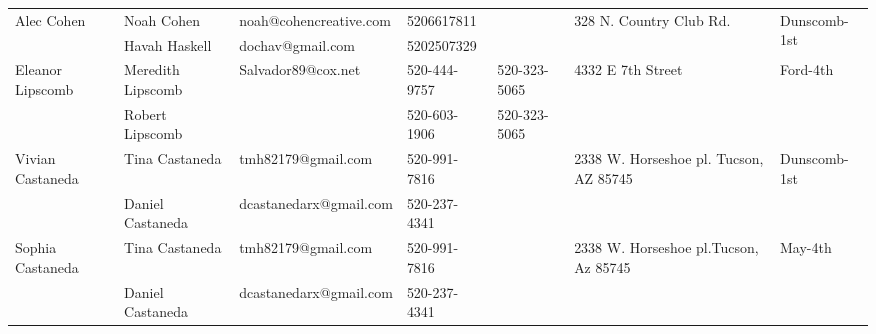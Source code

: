 \documentclass[landscape]{book}\usepackage[]{graphicx}\usepackage[]{color}
\begin{document}
\begin{longtable}{p{70pt}|p{75pt}|p{120pt}|p{60pt}|p{60pt}|p{100pt}|p{70pt}|}
\hline
\multirow{2}{70pt}{Alec Cohen} & Noah Cohen & noah@cohencreative.com & 5206617811 &  & \multirow{2}{100pt}{328 N. Country Club Rd.} & \multirow{2}{70pt}{Dunscomb-1st}\\
 & Havah Haskell & dochav@gmail.com & 5202507329 &  & & \\
\hline
\multirow{2}{70pt}{Eleanor Lipscomb} & Meredith Lipscomb & Salvador89@cox.net & 520-444-9757 & 520-323-5065 & \multirow{2}{100pt}{4332 E 7th Street} & \multirow{2}{70pt}{Ford-4th}\\
 & Robert Lipscomb &  & 520-603-1906 & 520-323-5065 & & \\
\hline
\multirow{2}{70pt}{Vivian Castaneda} & Tina Castaneda & tmh82179@gmail.com & 520-991-7816 &  & \multirow{2}{100pt}{2338 W. Horseshoe pl. Tucson, AZ 85745} & \multirow{2}{70pt}{Dunscomb-1st}\\
 & Daniel Castaneda & dcastanedarx@gmail.com & 520-237-4341 &  & & \\
\hline
\multirow{2}{70pt}{Sophia Castaneda} & Tina Castaneda & tmh82179@gmail.com & 520-991-7816 &  & \multirow{2}{100pt}{2338 W. Horseshoe pl.Tucson, Az 85745} & \multirow{2}{70pt}{May-4th}\\
 & Daniel Castaneda & dcastanedarx@gmail.com & 520-237-4341 &  & & \\
\hline

\hline
\end{longtable}
\end{document}
